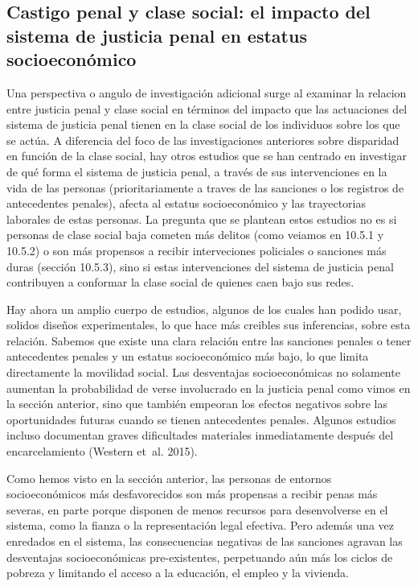 \documentclass[
  spanish,
  letterpaper,
  DIV=11,
  numbers=noendperiod]{scrreprt}
\begin{document}
\subsection{Castigo penal y clase social: el impacto del sistema de
justicia penal en estatus
socioeconómico}\label{castigo-penal-y-clase-social-el-impacto-del-sistema-de-justicia-penal-en-estatus-socioeconuxf3mico}

Una perspectiva o angulo de investigación adicional surge al examinar la
relacion entre justicia penal y clase social en términos del impacto que
las actuaciones del sistema de justicia penal tienen en la clase social
de los individuos sobre los que se actúa. A diferencia del foco de las
investigaciones anteriores sobre disparidad en función de la clase
social, hay otros estudios que se han centrado en investigar de qué
forma el sistema de justicia penal, a través de sus intervenciones en la
vida de las personas (prioritariamente a traves de las sanciones o los
registros de antecedentes penales), afecta al estatus socioeconómico y
las trayectorias laborales de estas personas. La pregunta que se
plantean estos estudios no es si personas de clase social baja cometen
más delitos (como veiamos en 10.5.1 y 10.5.2) o son más propensos a
recibir interveciones policiales o sanciones más duras (sección 10.5.3),
sino si estas intervenciones del sistema de justicia penal contribuyen a
conformar la clase social de quienes caen bajo sus redes.

Hay ahora un amplio cuerpo de estudios, algunos de los cuales han podido
usar, solidos diseños experimentales, lo que hace más creibles sus
inferencias, sobre esta relación. Sabemos que existe una clara relación
entre las sanciones penales o tener antecedentes penales y un estatus
socioeconómico más bajo, lo que limita directamente la movilidad social.
Las desventajas socioeconómicas no solamente aumentan la probabilidad de
verse involucrado en la justicia penal como vimos en la sección
anterior, sino que también empeoran los efectos negativos sobre las
oportunidades futuras cuando se tienen antecedentes penales. Algunos
estudios incluso documentan graves dificultades materiales
inmediatamente después del encarcelamiento (Western et~al. 2015).

Como hemos visto en la sección anterior, las personas de entornos
socioeconómicos más desfavorecidos son más propensas a recibir penas más
severas, en parte porque disponen de menos recursos para desenvolverse
en el sistema, como la fianza o la representación legal efectiva. Pero
además una vez enredados en el sistema, las consecuencias negativas de
las sanciones agravan las desventajas socioeconómicas pre-existentes,
perpetuando aún más los ciclos de pobreza y limitando el acceso a la
educación, el empleo y la vivienda.
\end{document}
